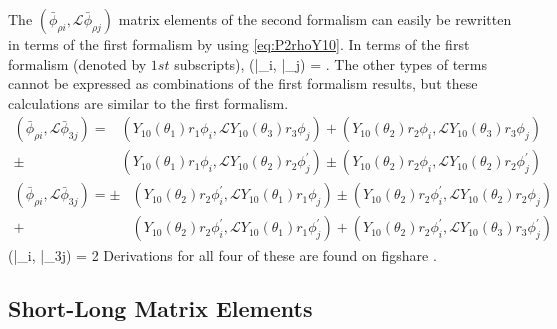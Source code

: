 \documentclass[Dissertation.tex]{subfiles}
\begin{document}
The $\left(\bar{\phi}_{\rho i},\mathcal{L} \bar{\phi}_{\rho j}\right)$ matrix
elements of the second formalism can easily be rewritten in terms of the first
formalism by using \cref{eq:P2rhoY10}. In terms of the first formalism (denoted
by $1st$ subscripts),
\beq
\left(\bar{\phi}_{\rho i}, \bar{\phi}_{\rho j}\right) =  .
\eeq
The other types of terms cannot be expressed as combinations of the first
formalism results, but these calculations are similar to the first formalism.
\begin{align}
\nonumber \left(\bar{\phi}_{\rho i},\mathcal{L} \bar{\phi}_{3j}\right) = &(Y_{10}(\theta_1) r_1 \phi_i, \mathcal{L} Y_{10}(\theta_3) r_3 \phi_j) + (Y_{10}(\theta_2) r_2 \phi_i, \mathcal{L} Y_{10}(\theta_3) r_3 \phi_j) \\
\pm &(Y_{10}(\theta_1) r_1 \phi_i, \mathcal{L} Y_{10}(\theta_2) r_2 \phi_j^\prime) \pm (Y_{10}(\theta_2) r_2 \phi_i, \mathcal{L} Y_{10}(\theta_2) r_2 \phi_j^\prime)
\end{align}
\begin{align}
\nonumber \left(\bar{\phi}_{\rho i},\mathcal{L} \bar{\phi}_{3j}\right) = \pm &(Y_{10}(\theta_2) r_2 \phi_i^\prime, \mathcal{L} Y_{10}(\theta_1) r_1 \phi_j) \pm (Y_{10}(\theta_2) r_2 \phi_i^\prime, \mathcal{L} Y_{10}(\theta_2) r_2 \phi_j) \\
+ &(Y_{10}(\theta_2) r_2 \phi_i^\prime, \mathcal{L} Y_{10}(\theta_1) r_1 \phi_j^\prime) + (Y_{10}(\theta_2) r_2 \phi_i^\prime, \mathcal{L} Y_{10}(\theta_3) r_3 \phi_j^\prime)
\end{align}
\beq
\nonumber \left(\bar{\phi}_{\rho i}, \bar{\phi}_{3j}\right) = 2 
\eeq
Derivations for all four of these are found on figshare \cite{figshare}.


\subsection{Short-Long Matrix Elements}
\label{sec:PWave2ndShortLong}
\end{document}

